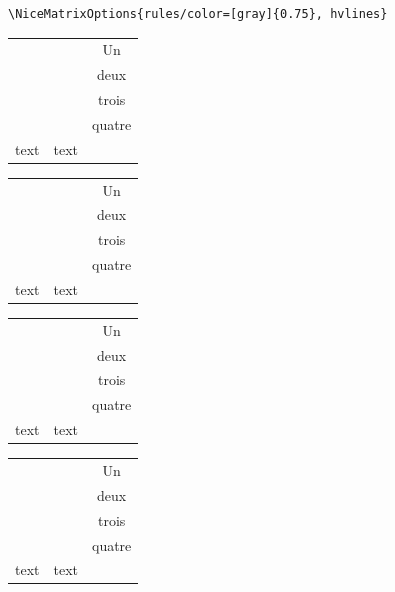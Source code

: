 \documentclass[dvipsnames]{article}
\begin{document}
\medskip
\begin{scope}

\begin{BVerbatim}
\NiceMatrixOptions{rules/color=[gray]{0.75}, hvlines}
\end{BVerbatim}

\bigskip

\begin{Code}[width=10cm,show-output]
\begin{NiceTabular}{ccc}
   & & \Huge Un\\
   & & deux  \\
   & & trois  \\
   & & \Huge quatre  \\
  text & text \\
\end{NiceTabular}
\end{Code}


\bigskip
\begin{Code}[width=10cm,show-output]
\begin{NiceTabular}{ccc}
   & & \Huge Un\\
   & & deux  \\
   & & trois  \\
   & & \Huge quatre  \\
  text & text \\
\end{NiceTabular}
\end{Code}

\bigskip
\begin{Code}[width=10cm,show-output]
\begin{NiceTabular}{ccc}
   & & \Huge Un\\
   & & deux  \\
   & & trois  \\
   & & \Huge quatre  \\
  text & text \\
\end{NiceTabular}
\end{Code}


\bigskip
\begin{Code}[width=10cm,show-output]
\begin{NiceTabular}{ccc}
   & & \Huge Un\\
   & & deux  \\
   & & trois  \\
   & & \Huge quatre  \\
  text & text \\
\end{NiceTabular}
\end{Code}

\end{scope}
\end{document}
